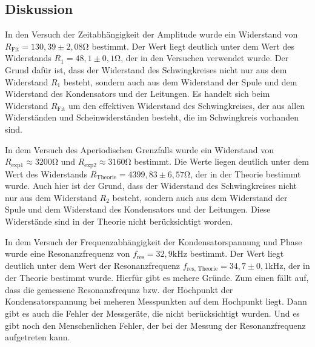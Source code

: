 \subsection{Diskussion}
In den Versuch der Zeitabhängigkeit der Amplitude wurde ein Widerstand von $R_{\text{Fit}} = 130,39 \pm 2,08 \mathrm{\Omega}$ bestimmt.
Der Wert liegt deutlich unter dem Wert des Widerstands $R_1 = 48,1 \pm 0,1 \mathrm{\Omega}$, der in den Versuchen verwendet wurde.
Der Grund dafür ist, dass der Widerstand des Schwingkreises nicht nur aus dem Widerstand $R_1$ besteht, sondern auch aus dem Widerstand der Spule und dem Widerstand des Kondensators
und der Leitungen. Es handelt sich beim Widerstand $R_{\text{Fit}}$ um den effektiven Widerstand des Schwingkreises, der aus allen Widerständen und Scheinwiderständen besteht, die im Schwingkreis vorhanden sind.

\noindent
In dem Versuch des Aperiodischen Grenzfalls wurde ein Widerstand von $R_{\text{exp1}} \approx 3200 \mathrm{\Omega}$ und $R_{\text{exp2}} \approx 3160 \mathrm{\Omega}$ bestimmt. 
Die Werte liegen deutlich unter dem Wert des Widerstands $R_{\text{Theorie}} = 4399,83 \pm 6,57 \mathrm{\Omega}$, der in der Theorie bestimmt wurde.
Auch hier ist der Grund, dass der Widerstand des Schwingkreises nicht nur aus dem Widerstand $R_2$ besteht, sondern auch aus dem Widerstand der Spule und dem Widerstand des Kondensators
und der Leitungen. Diese Widerstände sind in der Theorie nicht berücksichtigt worden.

\noindent
In dem Versuch der Frequenzabhängigkeit der Kondensatorspannung und Phase wurde eine Resonanzfrequenz von $f_{\text{res}} = 32,9 \mathrm{kHz}$ bestimmt. Der Wert liegt deutlich unter dem Wert der 
Resonanzfrequenz $f_{\text{res, Theorie}} = 34,7 \pm 0,1 \mathrm{kHz}$, der in der Theorie bestimmt wurde. Hierfür gibt es mehere Gründe.
Zum einen fällt auf, dass die gemessene Resonanzfrequnz bzw. der Hochpunkt der Kondensatorspannung
bei meheren Messpunkten auf dem Hochpunkt liegt.
Dann gibt es auch die Fehler der Messgeräte, die nicht berücksichtigt wurden.
Und es gibt noch den Menschenlichen Fehler, der bei der Messung der Resonanzfrequenz aufgetreten kann.

